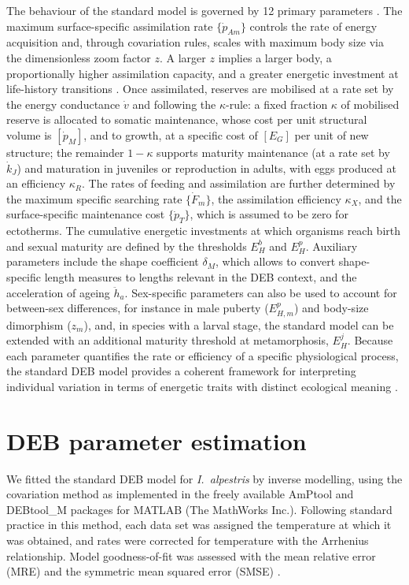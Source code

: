 \documentclass[12pt]{article}
\begin{document}
The behaviour of the standard model is governed by 12 primary parameters \parencite{kooijman2010}. The maximum surface-specific assimilation rate $\{\dot{p}_{Am}\}$ controls the rate of energy acquisition and, through covariation rules, scales with maximum body size via the dimensionless zoom factor $z$. A larger $z$ implies a larger body, a proportionally higher assimilation capacity, and a greater energetic investment at life-history transitions \parencite{sousa2008}. Once assimilated, reserves are mobilised at a rate set by the energy conductance $\dot{v}$ and following the $\kappa$-rule: a fixed fraction $\kappa$ of mobilised reserve is allocated to somatic maintenance, whose cost per unit structural volume is $[\dot{p}_M]$, and to growth, at a specific cost of $[E_G]$ per unit of new structure; the remainder $1-\kappa$ supports maturity maintenance (at a rate set by $\dot{k}_J$) and maturation in juveniles or reproduction in adults, with eggs produced at an efficiency $\kappa_R$. The rates of feeding and assimilation are further determined by the maximum specific searching rate $\{\dot{F}_m\}$, the assimilation efficiency $\kappa_X$, and the surface-specific maintenance cost $\{\dot{p}_T\}$, which is assumed to be zero for ectotherms. The cumulative energetic investments at which organisms reach birth and sexual maturity are defined by the thresholds $E_H^b$ and $E_H^p$. Auxiliary parameters include the shape coefficient $\delta_M$, which allows to convert shape-specific length measures to lengths relevant in the DEB context, and the acceleration of ageing $\ddot{h}_a$. Sex-specific parameters can also be used to account for between-sex differences, for instance in male puberty ($E_{H,m}^p$) and body-size dimorphism ($z_m$), and, in species with a larval stage, the standard model can be extended with an additional maturity threshold at metamorphosis, $E_H^j$. Because each parameter quantifies the rate or efficiency of a specific physiological process, the standard DEB model provides a coherent framework for interpreting individual variation in terms of energetic traits with distinct ecological meaning \parencite{kooijman2021}.

\section{DEB parameter estimation}\label{sm:deb-estimation}

We fitted the standard DEB model for \emph{I.~alpestris} by inverse modelling, using the covariation method \parencite{lika2011,marques2018} as implemented in the freely available AmPtool and DEBtool\_M packages for MATLAB (The MathWorks Inc.). Following standard practice in this method, each data set was assigned the temperature at which it was obtained, and rates were corrected for temperature with the Arrhenius relationship. Model goodness-of-fit was assessed with the mean relative error (MRE) and the symmetric mean squared error (SMSE) \parencite{marques2018}.
\end{document}

